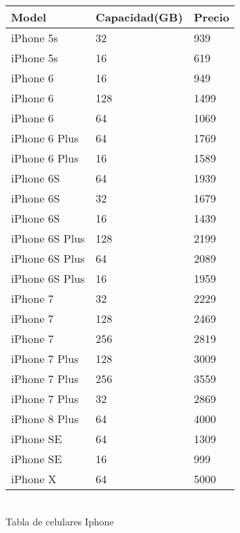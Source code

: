 \documentclass[a4paper ,12pt]{article}
\begin{document}
\begin{center}
	 	
		\begin{tabular}{lll}
			\hline
			Model&Capacidad(GB)&Precio \\
			\hline

			iPhone 5s&32&939 \\
			iPhone 5s&16&619 \\
			iPhone 6&16&949 \\
			iPhone 6&128&1499 \\
			iPhone 6&64&1069 \\
			iPhone 6 Plus&64&1769 \\
			iPhone 6 Plus&16&1589 \\
			iPhone 6S&64&1939\\
			iPhone 6S&32&1679\\
			iPhone 6S&16&1439\\
			iPhone 6S Plus&128&2199 \\
			iPhone 6S Plus&64&2089 \\
			iPhone 6S Plus&16&1959 \\
			iPhone 7&32&2229\\
			iPhone 7&128&2469\\
			iPhone 7&256&2819\\
			iPhone 7 Plus&128&3009 \\
			iPhone 7 Plus&256&3559 \\
			iPhone 7 Plus&32&2869 \\
			iPhone 8 Plus&64&4000 \\
			iPhone SE&64&1309 \\
			iPhone SE&16&999 \\
			iPhone X&64&5000 \\
			
		\hline
		\end{tabular}
	\\
	
	Tabla de celulares Iphone
\end{center}
\end{document}
